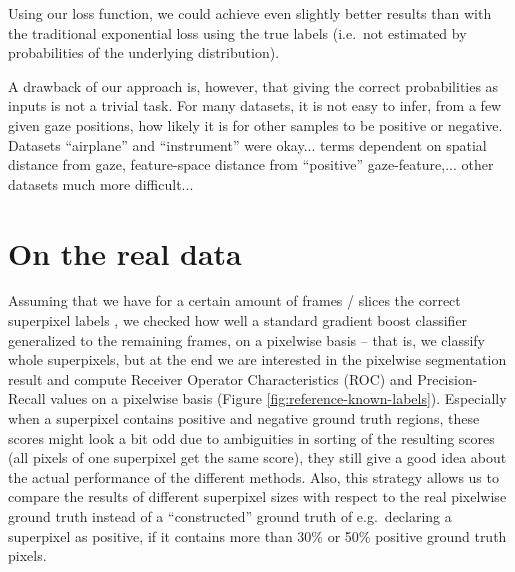 Using our loss function, we could achieve even slightly better results than with the traditional exponential loss using the true labels (i.e.\ not estimated by probabilities of the underlying distribution).

A drawback of our approach is, however, that giving the correct probabilities as inputs is not a trivial task. For many datasets, it is not easy to infer, from a few given gaze positions, how likely it is for other samples to be positive or negative. Datasets ``airplane'' and ``instrument'' were okay... terms dependent on spatial distance from gaze, feature-space distance from ``positive'' gaze-feature,... other datasets much more difficult...

\section{On the real data}
Assuming that we have for a certain amount of frames / slices the correct superpixel labels
, we checked how well a standard gradient boost classifier generalized to the remaining frames, on a pixelwise basis -- that is, we classify whole superpixels, but at the end we are interested in the pixelwise segmentation result and compute Receiver Operator Characteristics (ROC) and Precision-Recall values on a pixelwise basis (Figure \ref{fig:reference-known-labels}). 
Especially when a superpixel contains positive and negative ground truth regions, these scores might look a bit odd due to ambiguities in sorting of the resulting scores (all pixels of one superpixel get the same score), they still give a good idea about the actual performance of the different methods. Also, this strategy allows us to compare the results of different superpixel sizes with respect to the real pixelwise ground truth instead of a ``constructed'' ground truth of e.g.\ declaring a superpixel as positive, if it contains more than 30\% or 50\% positive ground truth pixels.

